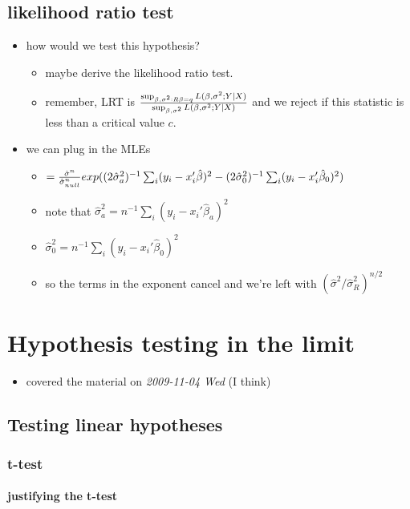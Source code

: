 \documentclass[11pt]{article}
\begin{document}
\subsection{likelihood ratio test}
\label{sec-2-4}

\begin{itemize}
\item how would we test this hypothesis?
\begin{itemize}
\item maybe derive the likelihood ratio test.
\item remember, LRT is ${\sup_{\beta, \sigma^2: R\beta = q} L(\beta,
         \sigma^2; Y \mid X) \over \sup_{\beta, \sigma^2} L(\beta,
         \sigma^2; Y \mid X)}$ and we reject if this statistic is less
         than a critical value $c$.
\end{itemize}
\item we can plug in the MLEs
\begin{itemize}
\item $= {\hat\sigma^n \over \hat\sigma^n_{null}}
         exp((2\hat\sigma^2_a)^{-1} \sum_i (y_i -
         x_i'\hat\beta)^2 - (2\hat\sigma^2_0)^{-1} \sum_i (y_i - x_i'\hat\beta_0)^2)$
\item note that $\hat\sigma^2_a = n^{-1} \sum_i (y_i -
         x_i'\hat\beta_a)^2$
\item $\hat\sigma^2_0 = n^{-1} \sum_i (y_i - x_i'\hat\beta_0)^2$
\item so the terms in the exponent cancel and we're left with
         $(\hat\sigma^2 / \hat\sigma^2_R)^{n/2}$
\end{itemize}
\end{itemize}
\section{Hypothesis testing in the limit}
\label{sec-3}

\begin{itemize}
\item covered the material on \textit{2009-11-04 Wed} (I think)
\end{itemize}
\subsection{Testing linear hypotheses}
\label{sec-3-1}
\subsubsection{t-test}
\label{sec-3-1-1}
\paragraph{justifying the t-test}
\label{sec-3-1-1-1}
\end{document}
